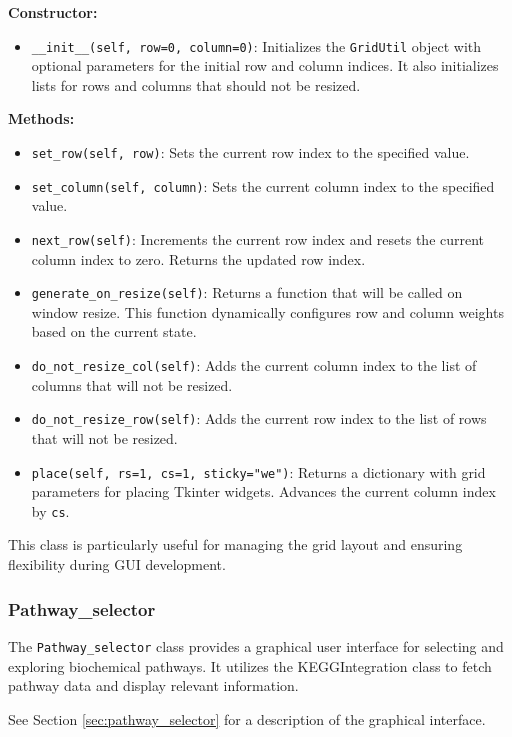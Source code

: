 \textbf{Constructor:}

\begin{itemize}
\item \texttt{\_\_init\_\_(self, row=0, column=0)}: Initializes the \texttt{GridUtil} object with optional parameters for the initial row and column indices. It also initializes lists for rows and columns that should not be resized.
\end{itemize}

\textbf{Methods:}

\begin{itemize}
\item \texttt{set\_row(self, row)}: Sets the current row index to the specified value.
\item \texttt{set\_column(self, column)}: Sets the current column index to the specified value.
\item \texttt{next\_row(self)}: Increments the current row index and resets the current column index to zero. Returns the updated row index.
\item \texttt{generate\_on\_resize(self)}: Returns a function that will be called on window resize. This function dynamically configures row and column weights based on the current state.
\item \texttt{do\_not\_resize\_col(self)}: Adds the current column index to the list of columns that will not be resized.
\item \texttt{do\_not\_resize\_row(self)}: Adds the current row index to the list of rows that will not be resized.
\item \texttt{place(self, rs=1, cs=1, sticky="we")}: Returns a dictionary with grid parameters for placing Tkinter widgets. Advances the current column index by \texttt{cs}.
\end{itemize}

This class is particularly useful for managing the grid layout and ensuring flexibility during GUI development.

\subsubsection{Pathway\_selector}

The \texttt{Pathway\_selector} class provides a graphical user interface for selecting and exploring biochemical pathways. It utilizes the KEGGIntegration class to fetch pathway data and display relevant information.

See Section \ref{sec:pathway_selector} for a description of the graphical interface.

